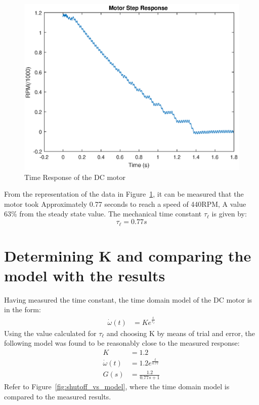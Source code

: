 \begin{figure}[h]
    \myfloatalign
    \includegraphics[width=1.2\textwidth]{gfx/Motor_shutoff} %
    \caption{Time Response of the DC motor}
    \label{fig:shutoff}
\end{figure}
From the representation of the data in Figure~\ref{fig:shutoff}, it can be measured that the motor took Approximately 0.77 seconds to reach a speed of 440RPM, A value 63\% from the steady state value. The mechanical time constant $\tau_\ell$ is given by:
\begin{equation}
	\tau_\ell = 0.77s
\end{equation}
\section{Determining K and comparing the model with the results}
Having measured the time constant, the time domain model of the DC motor is in the form:
\begin{align}
	\dot{\omega}(t) &= Ke^{\frac{t}{\tau_\ell} }
\end{align}
Using the value calculated for $\tau_\ell$ and choosing K by means of trial and error, the following model was found to be reasonably close to the measured response:
\begin{align}\label{eq:1}
	K &= 1.2\\
	\dot{\omega}(t) &= 1.2e^{\frac{t}{0.77} }\\
	G(s) &= \frac{1.2}{0.77s+1} 
\end{align}
Refer to Figure~\ref{fig:shutoff_vs_model}, where the time domain model is compared to the measured results. 


